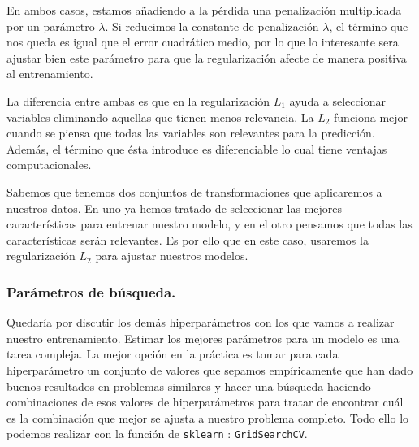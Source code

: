 \documentclass[a4paper, 20pt]{article}
\begin{document}
En ambos casos, estamos añadiendo a la pérdida una penalización multiplicada por un parámetro $\lambda$. Si reducimos la constante de penalización $\lambda$, el término que nos queda es igual que el error cuadrático medio, por lo que lo interesante sera ajustar bien este parámetro para que la regularización afecte de manera positiva al entrenamiento.

La diferencia entre ambas es que en la regularización $L_1$ ayuda a seleccionar variables eliminando aquellas que tienen menos relevancia. La $L_2$ funciona mejor cuando se piensa que todas las variables son relevantes para la predicción. Además, el término que ésta introduce es diferenciable lo cual tiene ventajas computacionales. 

Sabemos que tenemos dos conjuntos de transformaciones que aplicaremos a nuestros datos. En uno ya hemos tratado de seleccionar las mejores características para entrenar nuestro modelo, y en el otro pensamos que todas las características serán relevantes. Es por ello que en este caso, usaremos la regularización $L_2$ para ajustar nuestros modelos.

\subsubsection{Parámetros de búsqueda.}

Quedaría por discutir los demás hiperparámetros con los que vamos a realizar nuestro entrenamiento. Estimar los mejores parámetros para un modelo es una tarea compleja. La mejor opción en la práctica es tomar para cada hiperparámetro un conjunto de valores que sepamos empíricamente que han dado buenos resultados en problemas similares y hacer una búsqueda haciendo combinaciones de esos valores de hiperparámetros para tratar de encontrar cuál es la combinación que mejor se ajusta a nuestro problema completo. Todo ello lo podemos realizar con la función de \lstinline{sklearn} :  \lstinline{GridSearchCV}.
\end{document}
